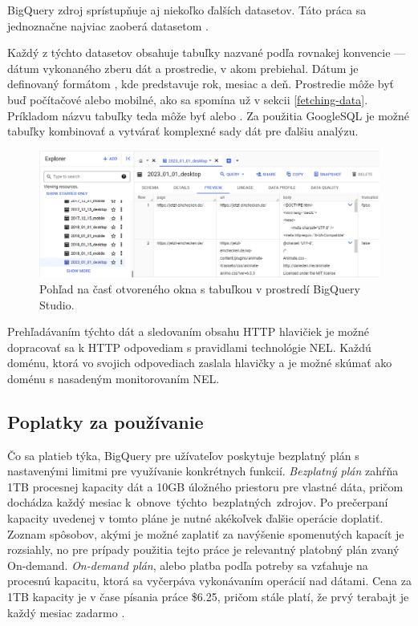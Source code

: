 BigQuery zdroj  sprístupňuje aj niekoľko ďalších datasetov. Táto práca sa jednoznačne najviac zaoberá datasetom .

Každý z týchto datasetov obsahuje tabuľky nazvané podľa rovnakej konvencie --- dátum vykonaného zberu dát a prostredie, v akom prebiehal.
Dátum je definovaný formátom , kde  predstavuje rok,  mesiac a  deň. 
Prostredie môže byť buď počítačové alebo mobilné, ako sa spomína už v sekcii \ref{fetching-data}.
Príkladom názvu tabuľky teda môže byť  alebo .
Za použitia GoogleSQL je možné tabuľky kombinovať a vytvárať komplexné sady dát pre ďalšiu analýzu.

\begin{figure}[htb]
\begin{center}
 \includegraphics[scale=0.53]{obrazky-figures/bigquery_response_bodies.png}    
 \caption{Pohľad na časť otvoreného okna s tabuľkou  v prostredí BigQuery Studio.}
 \label{img:bigquery-example-table}
\end{center}
\end{figure}

Prehľadávaním týchto dát a sledovaním obsahu HTTP hlavičiek je možné dopracovať sa k HTTP odpovediam s pravidlami technológie NEL.
Každú doménu, ktorá vo svojich odpovediach zaslala hlavičky  a  je možné skúmať ako doménu s nasadeným monitorovaním NEL.

\pagebreak

\subsection{Poplatky za používanie}
\label{httparchive-costs}

Čo sa platieb týka, BigQuery pre užívateľov poskytuje bezplatný plán s nastavenými limitmi pre využívanie konkrétnych funkcií.
\emph{Bezplatný plán} zahŕňa 1TB procesnej kapacity dát a 10GB úložného priestoru pre vlastné dáta, pričom dochádza každý mesiac \mbox{k obnove týchto bezplatných zdrojov}.
Po prečerpaní kapacity uvedenej v tomto pláne je nutné akékoľvek ďalšie operácie doplatiť.
Zoznam spôsobov, akými je možné zaplatiť za navýšenie spomenutých kapacít je rozsiahly, no pre prípady použitia tejto práce je relevantný platobný plán zvaný On-demand.
\emph{On-demand plán}, alebo platba podľa potreby sa vzťahuje na procesnú kapacitu, ktorá sa vyčerpáva vykonávaním operácií nad dátami.
Cena za 1TB kapacity je v čase písania práce \$6.25, pričom stále platí, že prvý terabajt je každý mesiac zadarmo \cite{google-bq-pricing}.

